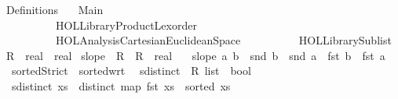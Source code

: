 %
\begin{isabellebody}%
%
%
\isadelimtheory
%
\endisadelimtheory
%
\isatagtheory
{}\isamarkupfalse%
\ Definitions\isanewline
\ \ \ Main\ \ \ \ \ \ \ \ \ \ \isanewline
\ \ \ \ \ \ \ \ \ \ \isanewline
\ \ \ \ \ \ \ \ \ \ {\isachardoublequoteopen}HOL{\isacharminus}{\kern0pt}Library{\isachardot}{\kern0pt}Product{\isacharunderscore}{\kern0pt}Lexorder{\isachardoublequoteclose}\isanewline
\ \ \ \ \ \ \ \ \ \ {\isachardoublequoteopen}HOL{\isacharminus}{\kern0pt}Analysis{\isachardot}{\kern0pt}Cartesian{\isacharunderscore}{\kern0pt}Euclidean{\isacharunderscore}{\kern0pt}Space{\isachardoublequoteclose}\isanewline
\ \ \ \ \ \ \ \ \ \ {\isachardoublequoteopen}HOL{\isacharminus}{\kern0pt}Library{\isachardot}{\kern0pt}Sublist{\isachardoublequoteclose}\isanewline
\isanewline
{}%
\endisatagtheory
{\isafoldtheory}%
%
\isadelimtheory
\isanewline
%
\endisadelimtheory
\isanewline
{}\isamarkupfalse%
\ R{}\ {\isacharequal}{\kern0pt}\ {\isachardoublequoteopen}real\ {\isasymtimes}\ real{\isachardoublequoteclose}\isanewline
\isanewline
{}\isamarkupfalse%
\ slope\ {\isacharcolon}{\kern0pt}{\isacharcolon}{\kern0pt}\ {\isachardoublequoteopen}R{}\ {\isasymRightarrow}\ R{}\ {\isasymRightarrow}\ real{\isachardoublequoteclose}\ \isanewline
\ \ {\isachardoublequoteopen}slope\ a\ b\ {\isacharequal}{\kern0pt}\ {\isacharparenleft}{\kern0pt}snd\ b\ {\isacharminus}{\kern0pt}\ snd\ a{\isacharparenright}{\kern0pt}\ {\isacharslash}{\kern0pt}\ {\isacharparenleft}{\kern0pt}fst\ b\ {\isacharminus}{\kern0pt}\ fst\ a{\isacharparenright}{\kern0pt}{\isachardoublequoteclose}\isanewline
\isanewline
{}\isamarkupfalse%
\isanewline
\ \ {\isachardoublequoteopen}sortedStrict\ {\isasymequiv}\ sorted{\isacharunderscore}{\kern0pt}wrt\ {\isacharparenleft}{\kern0pt}{\isacharless}{\kern0pt}{\isacharparenright}{\kern0pt}{\isachardoublequoteclose}\isanewline
\isanewline
{}\isamarkupfalse%
\ sdistinct\ {\isacharcolon}{\kern0pt}{\isacharcolon}{\kern0pt}\ {\isachardoublequoteopen}R{}\ list\ {\isasymRightarrow}\ bool{\isachardoublequoteclose}\ \isanewline
\ \ {\isachardoublequoteopen}sdistinct\ xs\ {\isasymequiv}\ distinct\ {\isacharparenleft}{\kern0pt}map\ fst\ xs{\isacharparenright}{\kern0pt}\ {\isasymand}\ sorted\ xs{\isachardoublequoteclose}\isanewline
\isanewline
{}\isamarkupfalse%

\end{isabellebody}
